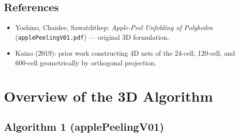 \documentclass[12pt,a4paper]{article}
\theoremstyle{definition}
\begin{document}
\subsection{References}

\begin{itemize}
  \item Yoshino, Chaidee, Sawatdithep:
        \textit{Apple-Peel Unfolding of Polyhedra}
        (\texttt{applePeelingV01.pdf}) --- original 3D formulation.
  \item Kaino (2019): prior work constructing 4D nets of the 24-cell,
        120-cell, and 600-cell geometrically by orthogonal projection.
\end{itemize}


\section{Overview of the 3D Algorithm}

\subsection{Algorithm 1 (applePeelingV01)}
\end{document}
